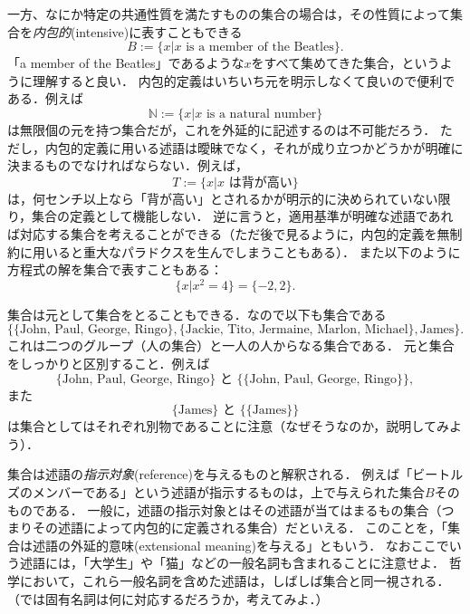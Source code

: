 \documentclass[11pt,a4paper]{jsarticle}
\begin{document}
一方、なにか特定の共通性質を満たすものの集合の場合は，その性質によって集合を\emph{内包的}(intensive)に表すこともできる
\[
 B := \{x | x \text{ is a member of the Beatles}\}.
\]
「a member of the Beatles」であるような$x$をすべて集めてきた集合，というように理解すると良い．
内包的定義はいちいち元を明示しなくて良いので便利である．例えば
\[
 \mathbb{N} := \{x | x \text{ is a natural number}\}
\]
は無限個の元を持つ集合だが，これを外延的に記述するのは不可能だろう．
ただし，内包的定義に用いる述語は曖昧でなく，それが成り立つかどうかが明確に決まるものでなければならない．例えば，
\[
 T := \{x | x \text{ は背が高い}\}
\]
は，何センチ以上なら「背が高い」とされるかが明示的に決められていない限り，集合の定義として機能しない．
逆に言うと，適用基準が明確な述語であれば対応する集合を考えることができる（ただ後で見るように，内包的定義を無制約に用いると重大なパラドクスを生んでしまうこともある）．
また以下のように方程式の解を集合で表すこともある：
\[
 \{ x | x^2 = 4\} = \{ -2, 2 \}.
\]


集合は元として集合をとることもできる．なので以下も集合である
\[
\{ \{\text{John, Paul, George, Ringo}\}, \{ \text{Jackie, Tito, Jermaine, Marlon, Michael}\}, \text{James} \}.
\]
これは二つのグループ（人の集合）と一人の人からなる集合である．
元と集合をしっかりと区別すること．例えば
\[
\{\text{John, Paul, George, Ringo}\} \text{ と } \{ \{\text{John, Paul, George, Ringo}\} \},
\]
また
\[
\{\text{James}\} \text{ と } \{ \{\text{James}\} \}  
\]
は集合としてはそれぞれ別物であることに注意（なぜそうなのか，説明してみよう）．



\begin{example}
集合は述語の\emph{指示対象}(reference)を与えるものと解釈される．
例えば「ビートルズのメンバーである」という述語が指示するものは，上で与えられた集合$B$そのものである．
一般に，述語の指示対象とはその述語が当てはまるもの集合（つまりその述語によって内包的に定義される集合）だといえる．
このことを，「集合は述語の外延的意味(extensional meaning)を与える」ともいう．
なおここでいう述語には，「大学生」や「猫」などの一般名詞も含まれることに注意せよ．
哲学において，これら一般名詞を含めた述語は，しばしば集合と同一視される．
（では固有名詞は何に対応するだろうか，考えてみよ．）
\end{example}
\end{document}
